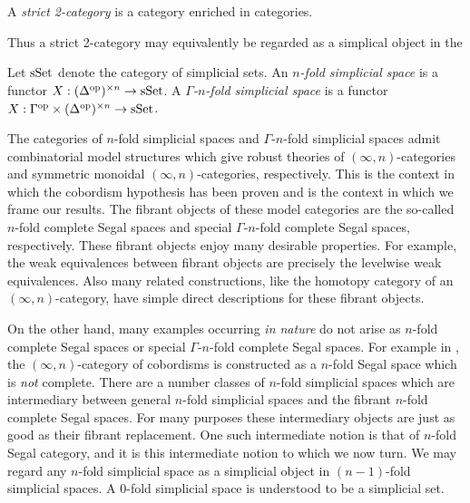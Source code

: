 \documentclass{amsart}
\begin{document}
\begin{example}
	A {\em strict 2-category} is a category enriched in categories.
\end{example}

Thus a strict 2-category may equivalently be regarded as a simplical object in the 

\begin{definition}
	Let $\mathrm{sSet}$ denote the category of simplicial sets. An {\em $n$-fold simplicial space} is a functor $X: (\Delta^\textrm{op})^{\times n} \to \mathrm{sSet}$. A {\em $\Gamma$-$n$-fold simplicial space} is a functor $X: \Gamma^\textrm{op} \times (\Delta^\textrm{op})^{\times n} \to \mathrm{sSet}$.
\end{definition}

The categories of $n$-fold simplicial spaces and $\Gamma$-$n$-fold simplicial spaces admit combinatorial model structures which give robust theories of $(\infty, n)$-categories and symmetric monoidal $(\infty, n)$-categories, respectively. This is the context in which the cobordism hypothesis has been proven and is the context in which we frame our results. The fibrant objects of these model categories are the so-called $n$-fold complete Segal spaces and special $\Gamma$-$n$-fold complete Segal spaces, respectively. These fibrant objects enjoy many desirable properties. For example, the weak equivalences between fibrant objects are precisely the levelwise weak equivalences. Also many related constructions, like the homotopy category of an $(\infty, n)$-category, have simple direct descriptions for these fibrant objects. 

On the other hand, many examples occurring {\em in nature} do not arise as $n$-fold complete Segal spaces or special $\Gamma$-$n$-fold complete Segal spaces. For example in \cite{Lurie}, the $(\infty, n)$-category of cobordisms is constructed as a $n$-fold Segal space which is {\em not} complete. There are a number classes of $n$-fold simplicial spaces which are intermediary between general $n$-fold simplicial spaces and the fibrant $n$-fold complete Segal spaces. For many purposes these intermediary objects are just as good as their fibrant replacement. One such intermediate notion is that of $n$-fold Segal category, and it is this intermediate notion to which we now turn. 
%
We may regard any $n$-fold simplicial space as a simplicial object in $(n-1)$-fold simplicial spaces. A $0$-fold simplicial space is understood to be a simplicial set. 
\end{document}
